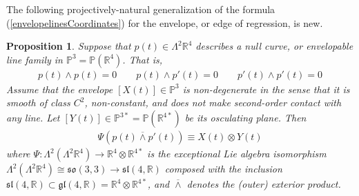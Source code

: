 \documentclass[12pt]{article}
\numberwithin{equation}{section}
\theoremstyle{plain}
\newtheorem{proposition}[definition]{Proposition}
\theoremstyle{definition}
\renewcommand{\P}{\mathbb{P}}
\renewcommand{\L}{\Lambda}
\newcommand{\R}{\mathbb{R}}
\newcommand{\ra}{\rightarrow}
\begin{document}
The following projectively-natural generalization of the formula (\ref{envelopelinesCoordinates}) for the envelope, or edge of regression, is new.
\begin{proposition}\label{projnatenv} Suppose that $p(t)\in \L^{2}\R^{4}$ describes a null curve, or envelopable line family in $\P^{3}=\P(\R^{4})$. That is,
\begin{align*}
p(t)\wedge p(t)=0 \qquad p(t)\wedge p'(t)=0 \qquad p'(t)\wedge p'(t)=0
\end{align*}
Assume that the envelope $[X(t)]\in \P^{3}$ is non-degenerate in the sense that it is smooth of class $C^{2}$, non-constant, and does not make second-order contact with any line. Let $[Y(t)]\in \P^{3*}=\P(\R^{4*})$ be its osculating plane. Then
\begin{align*}
\Psi(p(t)\overline{\wedge}p'(t))\equiv X(t)\otimes Y(t)
\end{align*}
where $\Psi:\L^{2}(\L^{2}\R^{4})\ra \R^{4}\otimes \R^{4*}$ is the exceptional Lie algebra isomorphism $\L^{2}(\L^{2}\R^{4})\cong\mathfrak{so}(3,3)\ra \mathfrak{sl}(4,\R)$ composed with the inclusion $\mathfrak{sl}(4,\R)\subset \mathfrak{gl}(4,\R)=\R^{4}\otimes \R^{4*}$, and $\overline{\wedge}$ denotes the (outer) exterior product.
\end{proposition}
\end{document}
